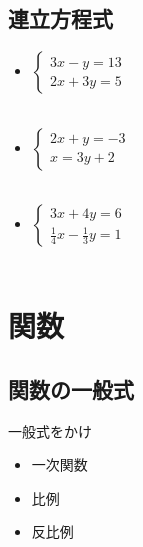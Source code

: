 \documentclass[10pt]{jsarticle}
\begin{document}
\subsection{連立方程式}
\begin{itembox}[l]{}
	\begin{Large}
		\begin{itemize}
			\item $
				      \left\{
				      \begin{array}{l}
					      3x-y=13 \\
					      2x+3y=5
				      \end{array}
				      \right.
			      $\\\\
			\item $
				      \left\{
				      \begin{array}{l}
					      2x+y=-3 \\
					      x=3y+2
				      \end{array}
				      \right.
			      $\\\\
			\item $
				      \left\{
				      \begin{array}{l}
					      3x+4y=6 \\
					      \frac{1}{4}x-\frac{1}{3}y=1
				      \end{array}
				      \right.
			      $\\\\
		\end{itemize}
	\end{Large}
\end{itembox}


\section{関数}
\subsection{関数の一般式}
\begin{itembox}[l]{一般式をかけ}
	\begin{multicols}{3}
		\begin{itemize}
			\item 一次関数
			\item 比例
			\item 反比例
		\end{itemize}
	\end{multicols}
\end{itembox}
\end{document}
